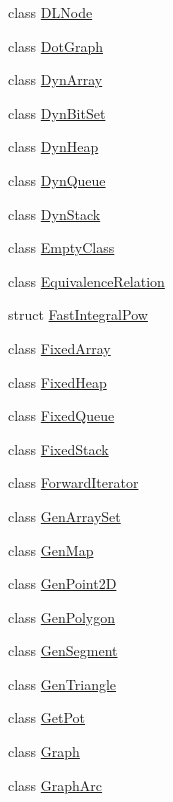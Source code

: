 \begin{DoxyCompactItemize}
class \hyperlink{class_designar_1_1_d_l_node}{D\+L\+Node}
\item 
class \hyperlink{class_designar_1_1_dot_graph}{Dot\+Graph}
\item 
class \hyperlink{class_designar_1_1_dyn_array}{Dyn\+Array}
\item 
class \hyperlink{class_designar_1_1_dyn_bit_set}{Dyn\+Bit\+Set}
\item 
class \hyperlink{class_designar_1_1_dyn_heap}{Dyn\+Heap}
\item 
class \hyperlink{class_designar_1_1_dyn_queue}{Dyn\+Queue}
\item 
class \hyperlink{class_designar_1_1_dyn_stack}{Dyn\+Stack}
\item 
class \hyperlink{class_designar_1_1_empty_class}{Empty\+Class}
\item 
class \hyperlink{class_designar_1_1_equivalence_relation}{Equivalence\+Relation}
\item 
struct \hyperlink{struct_designar_1_1_fast_integral_pow}{Fast\+Integral\+Pow}
\item 
class \hyperlink{class_designar_1_1_fixed_array}{Fixed\+Array}
\item 
class \hyperlink{class_designar_1_1_fixed_heap}{Fixed\+Heap}
\item 
class \hyperlink{class_designar_1_1_fixed_queue}{Fixed\+Queue}
\item 
class \hyperlink{class_designar_1_1_fixed_stack}{Fixed\+Stack}
\item 
class \hyperlink{class_designar_1_1_forward_iterator}{Forward\+Iterator}
\item 
class \hyperlink{class_designar_1_1_gen_array_set}{Gen\+Array\+Set}
\item 
class \hyperlink{class_designar_1_1_gen_map}{Gen\+Map}
\item 
class \hyperlink{class_designar_1_1_gen_point2_d}{Gen\+Point2D}
\item 
class \hyperlink{class_designar_1_1_gen_polygon}{Gen\+Polygon}
\item 
class \hyperlink{class_designar_1_1_gen_segment}{Gen\+Segment}
\item 
class \hyperlink{class_designar_1_1_gen_triangle}{Gen\+Triangle}
\item 
class \hyperlink{class_designar_1_1_get_pot}{Get\+Pot}
\item 
class \hyperlink{class_designar_1_1_graph}{Graph}
\item 
class \hyperlink{class_designar_1_1_graph_arc}{Graph\+Arc}
\item 

\end{DoxyCompactItemize}
